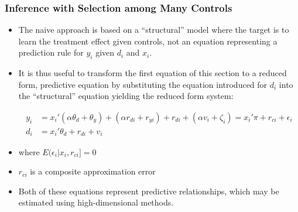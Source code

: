 \documentclass[
  shownotes,
  xcolor={svgnames},
  hyperref={colorlinks,citecolor=DarkBlue,linkcolor=DarkRed,urlcolor=DarkBlue}
  , aspectratio=169]{beamer}
\begin{document}
\begin{frame}[fragile]
\frametitle{Inference with Selection among Many Controls}
\begin{itemize}
\item The naive approach is based on a “structural” model where the target is to learn the treatment effect given controls, not an equation representing a prediction rule for $y_i$ given $d_i$ and $x_i$. 
\item It is thus useful to transform the first equation of this section to a reduced form, predictive equation by substituting the equation introduced for $d_i$ into the “structural” equation yielding the reduced form system:

\begin{align}
y_i &= x_i'(\alpha \theta_d +  \theta_y) + (\alpha r_{di} + r_{yi}) + r_{di}+ (\alpha v_i +\zeta_i) = x_i' \pi + r_{ci} + \epsilon_i \\ \nonumber
d_i &= x_i' \theta_d + r_{di} + v_i
\end{align}
\item where $E(\epsilon_i | x_i,r_{ci}]=0$ 
\item $r_{ci}$ is a composite approximation error
\item Both of these equations represent predictive relationships, which may be estimated using high-dimensional methods.


\end{itemize}

\end{frame}
\end{document}
